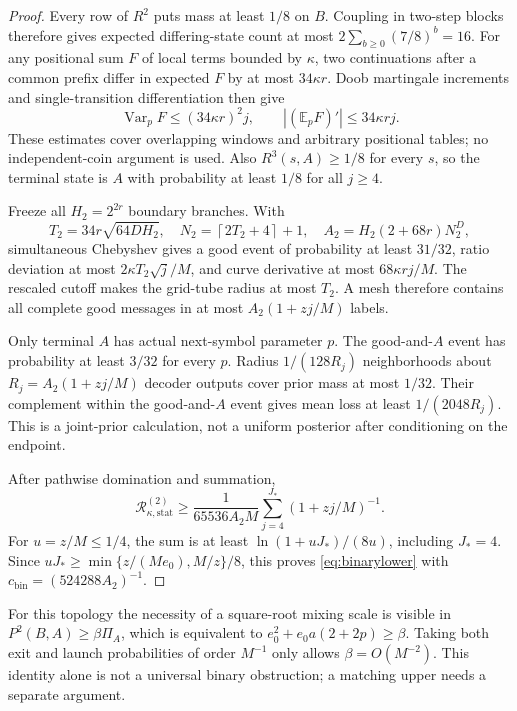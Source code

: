 \documentclass[11pt,letterpaper]{article}
\theoremstyle{definition}\newtheorem{definition}[theorem]{Definition}
\theoremstyle{remark}\newtheorem{remark}[theorem]{Remark}
\newcommand{\E}{\mathbb{E}}
\newcommand{\Var}{\operatorname{Var}}
\newcommand{\ceil}[1]{\left\lceil #1\right\rceil}
\newcommand{\Risk}{\mathcal{R}}
\begin{document}
\begin{proof}
Every row of $R^2$ puts mass at least $1/8$ on $B$. Coupling in two-step blocks therefore gives expected differing-state count at most
$2\sum_{b\ge0}(7/8)^b=16$. For any positional sum $F$ of local terms bounded by $\kappa$, two continuations after a common prefix differ in expected $F$ by at most $34\kappa r$. Doob martingale increments and single-transition differentiation then give
\[
 \Var_p F\le(34\kappa r)^2j,\qquad
 |(\E_pF)'|\le34\kappa rj.
\]
These estimates cover overlapping windows and arbitrary positional tables; no independent-coin argument is used. Also $R^3(s,A)\ge1/8$ for every $s$, so the terminal state is $A$ with probability at least $1/8$ for all $j\ge4$.

Freeze all $H_2=2^{2r}$ boundary branches. With
\[
 T_2=34r\sqrt{64DH_2},\quad N_2=\ceil{2T_2+4}+1,\quad
 A_2=H_2(2+68r)N_2^D,
\]
simultaneous Chebyshev gives a good event of probability at least $31/32$, ratio deviation at most $2\kappa T_2\sqrt j/M$, and curve derivative at most $68\kappa rj/M$. The rescaled cutoff makes the grid-tube radius at most $T_2$. A mesh therefore contains all complete good messages in at most $A_2(1+zj/M)$ labels.

Only terminal $A$ has actual next-symbol parameter $p$. The good-and-$A$ event has probability at least $3/32$ for every $p$. Radius $1/(128R_j)$ neighborhoods about $R_j=A_2(1+zj/M)$ decoder outputs cover prior mass at most $1/32$. Their complement within the good-and-$A$ event gives mean loss at least $1/(2048R_j)$. This is a joint-prior calculation, not a uniform posterior after conditioning on the endpoint.

After pathwise domination and summation,
\[
 \Risk_{\kappa,\mathrm{stat}}^{(2)}
 \ge\frac1{65536A_2M}\sum_{j=4}^{J_*}(1+zj/M)^{-1}.
\]
For $u=z/M\le1/4$, the sum is at least
$\ln(1+uJ_*)/(8u)$, including $J_*=4$.
Since $uJ_*\ge\min\{z/(Me_0),M/z\}/8$, this proves
\eqref{eq:binarylower} with $c_{\mathrm{bin}}=(524288A_2)^{-1}$.
\end{proof}

For this topology the necessity of a square-root mixing scale is visible in
$P^2(B,A)\ge\beta\Pi_A$, which is equivalent to
$e_0^2+e_0a(2+2p)\ge\beta$. Taking both exit and launch probabilities of order $M^{-1}$ only allows $\beta=O(M^{-2})$. This identity alone is not a universal binary obstruction; a matching upper needs a separate argument.
\end{document}
